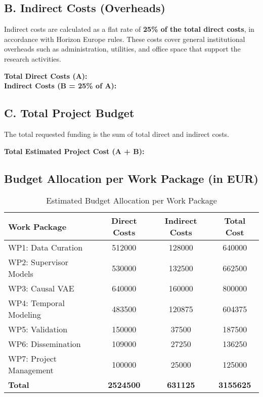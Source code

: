 \subsection*{B. Indirect Costs (Overheads)}
Indirect costs are calculated as a flat rate of \textbf{25\% of the total direct costs}, in accordance with Horizon Europe rules. These costs cover general institutional overheads such as administration, utilities, and office space that support the research activities.

\textbf{Total Direct Costs (A): } \\
\textbf{Indirect Costs (B = 25\% of A): }

\subsection*{C. Total Project Budget}
The total requested funding is the sum of total direct and indirect costs.

\textbf{Total Estimated Project Cost (A + B): }

\subsection*{Budget Allocation per Work Package (in EUR)}

\begin{table}[H]
\centering
\caption{Estimated Budget Allocation per Work Package}
\label{tab:budget_wp}
\begin{tabular}{lS[table-format=7.0]S[table-format=7.0]S[table-format=7.0]}
\toprule
\textbf{Work Package} & \textbf{Direct Costs} & \textbf{Indirect Costs} & \textbf{Total Cost} \\
\midrule
WP1: Data Curation & 512000 & 128000 & 640000 \\
WP2: Supervisor Models & 530000 & 132500 & 662500 \\
WP3: Causal VAE & 640000 & 160000 & 800000 \\
WP4: Temporal Modeling & 483500 & 120875 & 604375 \\
WP5: Validation & 150000 & 37500 & 187500 \\
WP6: Dissemination & 109000 & 27250 & 136250 \\
WP7: Project Management & 100000 & 25000 & 125000 \\
\midrule
\textbf{Total} & \textbf{2524500} & \textbf{631125} & \textbf{3155625} \\
\bottomrule
\end{tabular}
\end{table}
